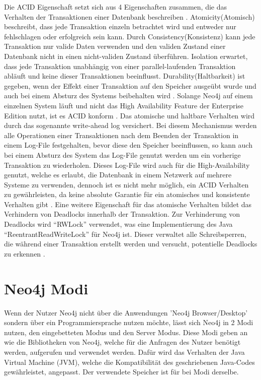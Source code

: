 Die ACID Eigenschaft setzt sich aus 4 Eigenschaften zusammen, die das Verhalten der Transaktionen einer  Datenbank beschreiben \parencite{haerder1983principles}. Atomicity(Atomisch) beschreibt, dass jede Transaktion einzeln betrachtet wird und entweder nur fehlschlagen oder erfolgreich sein kann. Durch Consistency(Konsistenz) kann jede Transaktion nur valide Daten verwenden und den validen Zustand einer Datenbank nicht in einen nicht-validen Zustand überführen. Isolation erwartet, dass jede Transaktion unabhängig von einer parallel-laufenden Transaktion abläuft und keine dieser Transaktionen beeinflusst. Durability(Haltbarkeit) ist gegeben, wenn der Effekt einer Transaktion auf den Speicher ausgeübt wurde und auch bei einem Absturz des Systems beibehalten wird \parencite{haerder1983principles}. Solange Neo4j auf einem einzelnen System läuft und nicht das High Availability Feature der Enterprise Edition nutzt, ist es ACID konform \parencite{holzschuher2013performance}. Das atomische und haltbare Verhalten wird durch das sogenannte write-ahead log versichert. Bei diesem Mechanismus  werden alle Operationen einer Transaktionen nach dem Beenden der Transaktion in einem Log-File  festgehalten, bevor diese  den Speicher beeinflussen, so kann auch bei einem Absturz des System das Log-File genutzt werden um ein vorherige Transaktion zu wiederholen.  Dieses Log-File wird auch für die High-Availability  genutzt, welche es erlaubt, die Datenbank in einem Netzwerk auf mehrere Systeme zu verwenden, dennoch ist es nicht mehr möglich, ein  ACID Verhalten zu gewährleisten, da keine absolute Garantie für ein  atomisches und konsistente Verhalten gibt \parencite{vukotic2015neo4j}. Eine weitere Eigenschaft für das atomische Verhalten bildet das Verhindern von Deadlocks innerhalb der Transaktion. Zur Verhinderung von Deadlocks wird “RWLock” verwendet, was eine Implementierung des Java “ReentrantReadWriteLock” für Neo4j ist. Dieser verwaltet alle Schreibsperren, die während einer Transaktion erstellt werden und versucht, potentielle Deadlocks zu erkennen \parencite{raj2015neo4j}.
\section {Neo4j Modi}
Wenn der Nutzer Neo4j nicht über die Anwendungen 'Neo4j Browser/Desktop' sondern über ein Programmiersprache nutzen möchte,  lässt sich Neo4j in 2 Modi nutzen, den eingebetteten Modus und den Server Modus. Diese Modi geben an wie die Bibliotheken von Neo4j, welche für die Anfragen des Nutzer benötigt werden, aufgerufen und verwendet werden. Dafür wird das Verhalten der Java Virtual Machine (JVM), welche die Kompatibilität des geschriebenen Java-Codes gewährleistet, angepasst. Der verwendete Speicher ist für bei Modi derselbe.

